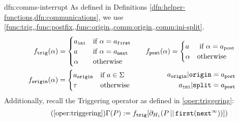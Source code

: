 \documentclass[../hons_project.tex]{subfiles}
\begin{document}
\begin{dfn}{dfn:comms-interrupt}{}
	As defined in Definitions \cref{dfn:helper-functions,dfn:communications}, we use \cref{func:trig,,func:postfix,,func:origin,,comm:origin,,comm:ini-split}.
	\begin{align*}
		f_{\mathtt{trig}}(\alpha) & = \begin{cases}
			                              a_{\mathtt{ini}} & \text{if } \alpha = a_{\mathtt{first}} \\
			                              a                & \text{if } \alpha = a_{\mathtt{next}}  \\
			                              \alpha           & \text{otherwise}
		                              \end{cases} \quad
		                          & f_{\mathtt{post}}(\alpha) = \begin{cases}
			                                                        a      & \text{ if } \alpha = a_{\mathrm{post}} \\
			                                                        \alpha & \text{otherwise}
		                                                        \end{cases}                                     \\
		f_{\mathtt{origin}}(\alpha)     & = \begin{cases}
			                              a_{\mathtt{origin}} & \text{if } a\in\Sigma \\
			                              \tau                & \text{otherwise}
		                              \end{cases}                         & \begin{split}
			                                                                    a_{\mathtt{origin}} | \mathtt{origin}  = a_{\mathtt{post}} & \\
			                                                                    a_{\mathtt{ini}} | \mathtt{split} = a_{\mathtt{post}}      &
		                                                                    \end{split}
	\end{align*}
	Additionally, recall the Triggering operator as defined in \ref{oper:triggering}:
	\begin{equation}\tag{\ref{oper:triggering}}
		\Gamma(P) := f_{\mathtt{trig}}[\partial_{H_{1}}(P \merge \mathtt{first}(\mathtt{next}^{\infty}))])
	\end{equation}
\end{dfn}
\end{document}
